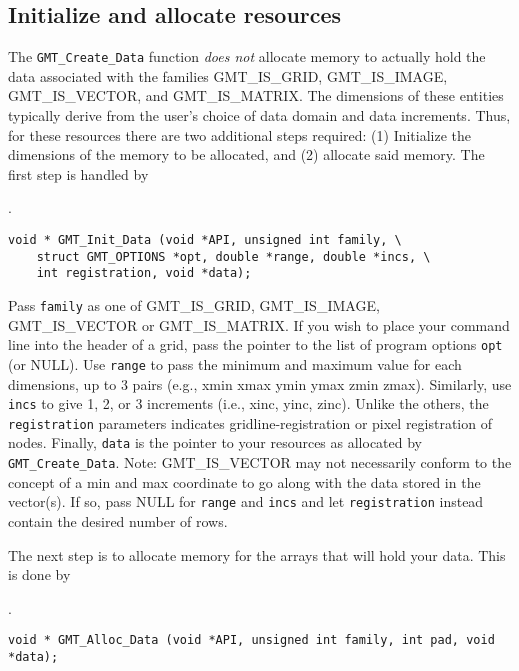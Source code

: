 \documentclass[11pt]{report}
\begin{document}

\subsection{Initialize and allocate resources}

The \texttt{GMT\_Create\_Data} function \emph{does not} allocate memory to actually hold
the data associated with the families GMT\_IS\_GRID, GMT\_IS\_IMAGE, GMT\_IS\_VECTOR,
and GMT\_IS\_MATRIX.  The dimensions of these entities typically derive from the user's
choice of data domain and data increments.  Thus, for these resources there are two
additional steps required: (1) Initialize the dimensions of the memory to be allocated,
and (2) allocate said memory.  The first step is handled by 

.

\begin{verbatim}
void * GMT_Init_Data (void *API, unsigned int family, \
    struct GMT_OPTIONS *opt, double *range, double *incs, \
    int registration, void *data);
\end{verbatim}

Pass \texttt{family} as one of GMT\_IS\_GRID, GMT\_IS\_IMAGE, GMT\_IS\_VECTOR or GMT\_IS\_MATRIX.
If you wish to place your command line into the header of a grid, pass the pointer to the list
of program options \texttt{opt} (or NULL).  Use \texttt{range} to pass the minimum and maximum
value for each dimensions, up to 3 pairs (e.g., xmin xmax ymin ymax zmin zmax). Similarly, use
\texttt{incs} to give 1, 2, or 3 increments (i.e., xinc, yinc, zinc).  Unlike the others, the
\texttt{registration} parameters indicates gridline-registration or pixel registration of nodes.
Finally, \texttt{data} is the pointer to your resources as allocated by \texttt{GMT\_Create\_Data}.
Note: GMT\_IS\_VECTOR may not necessarily conform to the concept of a min and max coordinate to go
along with the data stored in the vector(s).  If so, pass NULL for \texttt{range} and \texttt{incs}
and let \texttt{registration} instead contain the desired number of rows.

The next step is to allocate memory for the arrays that will hold your data.  This is done by

\index{GMT\_Alloc\_Data}.

\begin{verbatim}
void * GMT_Alloc_Data (void *API, unsigned int family, int pad, void *data);
\end{verbatim}
\end{document}

